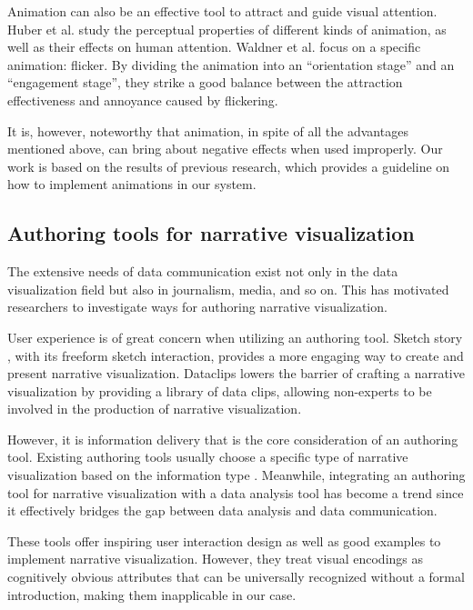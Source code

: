 Animation can also be an effective tool to attract and guide visual attention. Huber et al. \cite{huber_visualizing_2005} study the perceptual properties of different kinds of animation, as well as their effects on human attention. Waldner et al. \cite{waldner_attractive_2014} focus on a specific animation: flicker. By dividing the animation into an “orientation stage” and an “engagement stage”, they strike a good balance between the attraction effectiveness and annoyance caused by flickering. 

It is, however, noteworthy that animation, in spite of all the advantages mentioned above, can bring about negative effects when used improperly\cite{robertson_effectiveness_2008}. Our work is based on the results of previous research, which provides a guideline on how to implement animations in our system.

\subsection{Authoring tools for narrative visualization}
The extensive needs of data communication exist not only in the data visualization field but also in journalism, media, and so on. This has motivated researchers to investigate ways for authoring narrative visualization. 

User experience is of great concern when utilizing an authoring tool. Sketch story \cite{lee_sketchstory:_2013}, with its freeform sketch interaction, provides a more engaging way to create and present narrative visualization. Dataclips \cite{amini_authoring_2017} lowers the barrier of crafting a narrative visualization by providing a library of data clips, allowing non-experts to be involved in the production of narrative visualization. 

However, it is information delivery that is the core consideration of an authoring tool. Existing authoring tools usually choose a specific type of narrative visualization based on the information type \cite{amini_authoring_2017, fulda_timelinecurator:_2016}. Meanwhile, integrating an authoring tool for narrative visualization with a  data analysis tool has become a trend since it effectively bridges the gap between data analysis and data communication\cite{eccles_stories_2007, bryan_temporal_2016,lee_more_2015}. 
 
These tools offer inspiring user interaction design as well as good examples to implement narrative visualization. However, they treat visual encodings as cognitively obvious attributes that can be universally recognized without a formal introduction, making them inapplicable in our case. 

